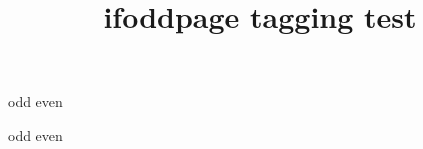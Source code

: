 \documentclass{article}
\title{ifoddpage tagging test}
\begin{document}
\checkoddpage
\ifoddpage
odd
\else
even
\fi

\newpage

\checkoddpage
\ifoddpage
odd
\else
even
\fi
\end{document}
